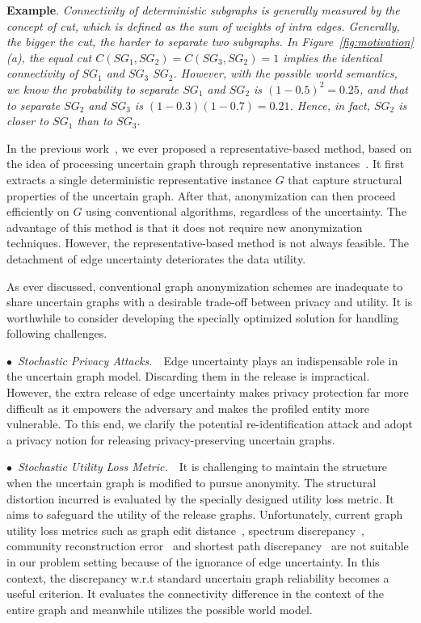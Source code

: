 \textbf{Example}. \emph{Connectivity of deterministic subgraphs is generally measured by the concept of cut, which is defined as the sum of weights of intra edges. Generally, the bigger the cut, the harder to separate two subgraphs. In Figure~\ref{fig:motivation}(a), the equal cut $C(SG_{1},SG_{2})=C(SG_{3},SG_{2})=1$ implies the identical connectivity of $SG_{1}$ and $SG_{3}$ {\wrt} $SG_{2}$. However, with the possible world semantics, we know the probability to separate $SG_{1}$ and $SG_{2}$ is $(1-0.5)^{2}=0.25$, and that to separate $SG_{2}$ and $SG_{3}$ is $(1-0.3)(1-0.7)=0.21$. Hence, in fact, $SG_{2}$ is closer to $SG_{1}$ than to $SG_{3}$. }

In the previous work~\cite{Xiao:2018}, we ever proposed a representative-based method, based on the idea of processing uncertain graph through representative instances~\cite{Parchas_Gullo_Papadias_Bonchi_2014}.
It first extracts a single deterministic representative instance $G$ that capture structural properties of the uncertain graph.
After that, anonymization can then proceed efficiently on $G$ using conventional algorithms, regardless of the uncertainty.  
The advantage of this method is that it does not require new anonymization techniques. 
However, the representative-based method is not always feasible. 
The detachment of edge uncertainty deteriorates the data utility. 

As ever discussed, conventional graph anonymization schemes are inadequate to share uncertain graphs with a desirable trade-off between privacy and utility. 
It is worthwhile to consider developing the specially optimized solution for handling following challenges. 

$\bullet$~\textup{\emph{Stochastic Privacy Attacks.}}~~Edge uncertainty plays an indispensable role in the uncertain graph model. Discarding them in the release is impractical.  
However, the extra release of edge uncertainty makes privacy protection far more difficult as it empowers the adversary and makes the profiled entity more vulnerable. 
To this end, we clarify the potential re-identification attack and adopt a privacy notion for releasing privacy-preserving uncertain graphs.

$\bullet$~\textup{\emph{Stochastic Utility Loss Metric.}}~~It is challenging to maintain the structure when the uncertain graph is modified to pursue anonymity. 
The structural distortion incurred is evaluated by the specially designed utility loss metric.  
It aims to safeguard the utility of the release graphs.  
Unfortunately, current graph utility loss metrics such as graph edit distance~\cite{Liu_Towards_2008}, spectrum discrepancy~\cite{Ying_Randomizing_2008}, community reconstruction error~\cite{Wang2011} and shortest path discrepancy~\cite{Liu_Privacy_2009} 
are not suitable in our problem setting because of the ignorance of edge uncertainty.
In this context, the discrepancy w.r.t standard uncertain graph reliability becomes a useful criterion. It evaluates the connectivity difference in the context of the entire graph and meanwhile utilizes the possible world model. 

